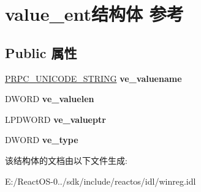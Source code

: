 \hypertarget{structvalue__ent}{}\section{value\+\_\+ent结构体 参考}
\label{structvalue__ent}
\subsection*{Public 属性}
\begin{DoxyCompactItemize}
\item 
\mbox{\label{structvalue__ent_aedf7f2b6d0fbb4a54800ad9b1fff1665}} 
\hyperlink{struct___r_p_c___u_n_i_c_o_d_e___s_t_r_i_n_g}{P\+R\+P\+C\+\_\+\+U\+N\+I\+C\+O\+D\+E\+\_\+\+S\+T\+R\+I\+NG} {\bfseries ve\+\_\+valuename}
\item 
\mbox{\label{structvalue__ent_af3bb7a56d555545f247caedabf04f044}} 
D\+W\+O\+RD {\bfseries ve\+\_\+valuelen}
\item 
\mbox{\label{structvalue__ent_a12af4c66488ee670eae3f1878e24000f}} 
L\+P\+D\+W\+O\+RD {\bfseries ve\+\_\+valueptr}
\item 
\mbox{\label{structvalue__ent_a43042bd0480281495dddfbda741f646f}} 
D\+W\+O\+RD {\bfseries ve\+\_\+type}
\end{DoxyCompactItemize}


该结构体的文档由以下文件生成\+:\begin{DoxyCompactItemize}
\item 
E\+:/\+React\+O\+S-\/0../sdk/include/reactos/idl/winreg.\+idl\end{DoxyCompactItemize}
